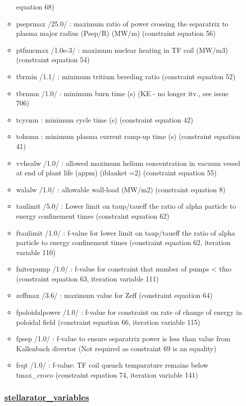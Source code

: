 \documentclass[
]{article}
\begin{document}
\begin{itemize}
\begin{itemize}
    equation 68)
  \item
    pseprmax /25.0/ : maximum ratio of power crossing the separatrix to
    plasma major radius (Psep/R) (MW/m) (constraint equation 56)
  \item
    ptfnucmax /1.0e-3/ : maximum nuclear heating in TF coil (MW/m3)
    (constraint equation 54)
  \item
    tbrmin /1.1/ : minimum tritium breeding ratio (constraint equation
    52)
  \item
    tbrnmn /1.0/ : minimum burn time (s) (KE - no longer itv., see issue
    706)
  \item
    tcycmn : minimum cycle time (s) (constraint equation 42)
  \item
    tohsmn : minimum plasma current ramp-up time (s) (constraint
    equation 41)
  \item
    vvhealw /1.0/ : allowed maximum helium concentration in vacuum
    vessel at end of plant life (appm) (iblanket =2) (constraint
    equation 55)
  \item
    walalw /1.0/ : allowable wall-load (MW/m2) (constraint equation 8)
  \item
    taulimit /5.0/ : Lower limit on taup/taueff the ratio of alpha
    particle to energy confinement times (constraint equation 62)
  \item
    ftaulimit /1.0/ : f-value for lower limit on taup/taueff the ratio
    of alpha particle to energy confinement times (constraint equation
    62, iteration variable 110)
  \item
    fniterpump /1.0/ : f-value for constraint that number of pumps
    \textless{} tfno (constraint equation 63, iteration variable 111)
  \item
    zeffmax /3.6/ : maximum value for Zeff (constraint equation 64)
  \item
    fpoloidalpower /1.0/ : f-value for constraint on rate of change of
    energy in poloidal field (constraint equation 66, iteration variable
    115)
  \item
    fpsep /1.0/ : f-value to ensure separatrix power is less than value
    from Kallenbach divertor (Not required as constraint 69 is an
    equality)
  \item
    fcqt /1.0/ : f-value: TF coil quench temparature remains below
    tmax\_croco (constraint equation 74, iteration variable 141)
  \end{itemize}

  \hypertarget{stellarator_variables}{%
  \subsubsection{\texorpdfstring{\href{stellarator_variables.html}{stellarator\_variables}}{stellarator\_variables}}\label{stellarator_variables}}


\end{itemize}
\end{document}
